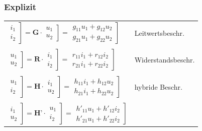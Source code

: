 \documentclass[a4paper,twocolumn,10pt]{article}
\begin{document}
\subsubsection*{Explizit}
\begin{tabular}{ll}
$\left.\begin{matrix}i_1\\i_2\end{matrix}\right] =\textbf{G}\cdot \left.\begin{matrix}u_1\\u_2\end{matrix}\right]=\left.\begin{matrix}g_{11}u_1+g_{12}u_2\\g_{21}u_1+g_{22}u_2\end{matrix}\right]$ &
Leitwertsbeschr.\\\\
$\left.\begin{matrix}u_1\\u_2\end{matrix}\right] =\textbf{R}\cdot \left.\begin{matrix}i_1\\i_2\end{matrix}\right]=\left.\begin{matrix}r_{11}i_1+r_{12}i_2\\r_{21}i_1+r_{22}i_2\end{matrix}\right]$ &
Widerstandsbeschr.\\\\
$\left.\begin{matrix}u_1\\i_2\end{matrix}\right] =\textbf{H}\cdot \left.\begin{matrix}i_1\\u_2\end{matrix}\right]=\left.\begin{matrix}h_{11}i_1+h_{12}u_2\\h_{21}i_1+h_{22}u_2\end{matrix}\right]$ &
hybride Beschr.\\\\
$\left.\begin{matrix}i_1\\u_2\end{matrix}\right] =\textbf{H'}\cdot \left.\begin{matrix}u_1\\i_2\end{matrix}\right]=\left.\begin{matrix}h'_{11}u_1+h'_{12}i_2\\h'_{21}u_1+h'_{22}i_2\end{matrix}\right]$ &

\end{tabular}
\end{document}
